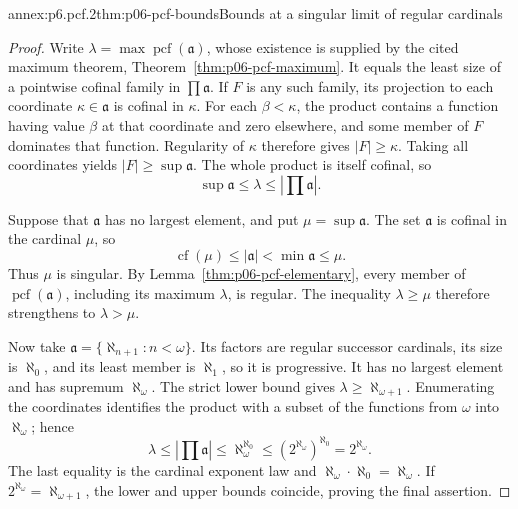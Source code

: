 \begin{annexitem}{annex:p6.pcf.2}{thm:p06-pcf-bounds}{Bounds at a singular limit of regular cardinals}
\begin{proof}
Write \(\lambda=\max\operatorname{pcf}(\mathfrak a)\), whose existence
is supplied by the cited maximum theorem,
Theorem~\ref{thm:p06-pcf-maximum}.
It equals the least size of a pointwise cofinal family in
\(\prod\mathfrak a\).
If \(F\) is any such family, its projection to each coordinate
\(\kappa\in\mathfrak a\) is cofinal in \(\kappa\).
For each \(\beta<\kappa\), the product contains a function having
value \(\beta\) at that coordinate and zero elsewhere, and some
member of \(F\) dominates that function.
Regularity of \(\kappa\) therefore gives \(|F|\geq\kappa\).
Taking all coordinates yields \(|F|\geq\sup\mathfrak a\).
The whole product is itself cofinal, so
\[
 \sup\mathfrak a\leq\lambda\leq\left|\prod\mathfrak a\right|.
\]

Suppose that \(\mathfrak a\) has no largest element, and put
\(\mu=\sup\mathfrak a\).
The set \(\mathfrak a\) is cofinal in the cardinal \(\mu\), so
\[
 \operatorname{cf}(\mu)\leq|\mathfrak a|
             <\min\mathfrak a\leq\mu.
\]
Thus \(\mu\) is singular.
By Lemma~\ref{thm:p06-pcf-elementary}, every member of
\(\operatorname{pcf}(\mathfrak a)\), including its maximum
\(\lambda\), is regular.
The inequality \(\lambda\geq\mu\) therefore strengthens to
\(\lambda>\mu\).

Now take \(\mathfrak a=\{\aleph_{n+1}:n<\omega\}\).
Its factors are regular successor cardinals, its size is \(\aleph_0\),
and its least member is \(\aleph_1\), so it is progressive.
It has no largest element and has supremum \(\aleph_\omega\).
The strict lower bound gives
\(\lambda\geq\aleph_{\omega+1}\).
Enumerating the coordinates identifies the product with a subset
of the functions from \(\omega\) into \(\aleph_\omega\); hence
\[
 \lambda\leq\left|\prod\mathfrak a\right|
       \leq\aleph_\omega^{\aleph_0}
       \leq(2^{\aleph_\omega})^{\aleph_0}
       =2^{\aleph_\omega}.
\]
The last equality is the cardinal exponent law and
\(\aleph_\omega\cdot\aleph_0=\aleph_\omega\).
If \(2^{\aleph_\omega}=\aleph_{\omega+1}\), the lower and upper
bounds coincide, proving the final assertion.
\end{proof}
\end{annexitem}
